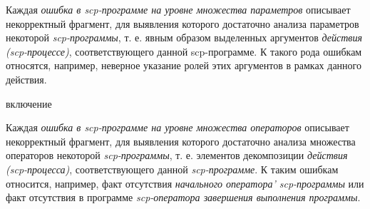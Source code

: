 Каждая \textit{ошибка в scp-программе на уровне множества параметров} описывает некорректный фрагмент, для выявления которого достаточно анализа параметров некоторой \textit{scp-программы}, т. е. явным образом выделенных аргументов \textit{действия (scp-процессе)}, соответствующего данной scp-программе. К такого рода ошибкам относятся, например, неверное указание ролей этих аргументов в рамках данного действия.

\begin{SCn}
\begin{scnrelfromlist}{включение}
    \begin{scnindent}
    \end{scnindent}
    \begin{scnindent}
    \end{scnindent}
\end{scnrelfromlist}
\end{SCn}

Каждая \textit{ошибка в scp-программе на уровне множества операторов} описывает некорректный фрагмент, для выявления которого достаточно анализа множества операторов некоторой \textit{scp-программы}, т. е. элементов декомпозиции \textit{действия (scp-процесса)}, соответствующего данной \textit{scp-программе}. К таким ошибкам относится, например, факт отсутствия \textit{начального оператора' scp-программы} или факт отсутствия в программе \textit{scp-оператора завершения выполнения программы}.

